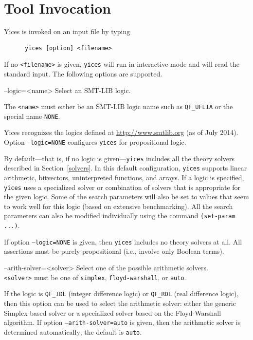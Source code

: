 \documentclass[11pt,twoside,fleqn,openright,titlepage]{cslreport}
\newenvironment{options}{
\begin{list}{}{
\setlength{\labelsep}{1.8ex}
\setlength{\labelwidth}{0pt}
\setlength{\itemindent}{-0.5\leftmargin}
\settowidth{\leftmargin}{\texttt{--}}
\renewcommand{\makelabel}{\optionlabel}}}
{\end{list}}
\newcommand*\optionlabel[1]{\hspace\labelsep\texttt{#1}}
\begin{document}
\section{Tool Invocation}

Yices is invoked on an input file by typing
\begin{verbatim}
      yices [option] <filename>
\end{verbatim}
If no \texttt{<filename>} is given, \texttt{yices} will run in
interactive mode and will read the standard input. The following
options are supported.
\begin{options}
\item[--logic=<name>] Select an SMT-LIB logic.

  The \texttt{<name>} must either be an SMT-LIB logic name such as
  \texttt{QF\_UFLIA} or the special name \texttt{NONE}.

  Yices recognizes the logics defined at \url{http://www.smtlib.org}
  (as of July 2014).  Option \texttt{--logic=NONE} configures
  \texttt{yices} for propositional logic.

  By default---that is, if no logic is given---\texttt{yices} includes
  all the  theory solvers described in  Section~\ref{solvers}. In this
  default  configuration, \texttt{yices}  supports  linear arithmetic,
  bitvectors,  uninterpreted  functions, and  arrays.  If  a logic  is
  specified, \texttt{yices}  uses a specialized  solver or combination
  of  solvers that is  appropriate for  the given  logic. Some  of the
  search parameters will also be set  to values that seem to work well
  for  this logic (based  on extensive  benchmarking). All  the search
  parameters  can  also be  modified  individually  using the  command
  \texttt{(set-param ...)}.

  If  option  \texttt{--logic=NONE}   is  given,  then  \texttt{yices}
  includes no  theory solvers  at all. All  assertions must  be purely
  propositional (i.e., involve only Boolean terms).

\item[--arith-solver=<solver>] Select one of the possible arithmetic solvers.\\[1mm]
  \texttt{<solver>}     must    be     one     of    \texttt{simplex},
  \texttt{floyd-warshall}, or \texttt{auto}.

  If  the  logic is  \texttt{QF\_IDL}  (integer  difference logic)  or
  \texttt{QF\_RDL} (real  difference logic),  then this option  can be
  used   to  select   the  arithmetic   solver:  either   the  generic
  Simplex-based  solver   or  a   specialized  solver  based   on  the
  Floyd-Warshall algorithm.  If option \texttt{--arith-solver=auto} is
  given, then  the arithmetic solver is  determined automatically; the
  default is \texttt{auto}.


\end{options}
\end{document}
